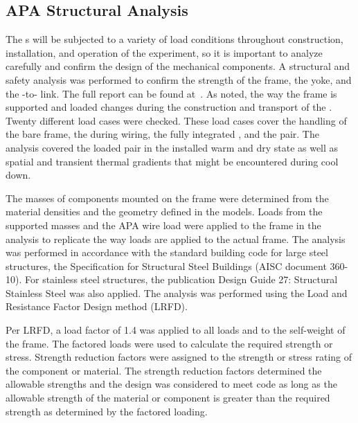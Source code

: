 \subsection{APA Structural Analysis}

The s will be subjected to a variety of load conditions throughout construction, installation, and operation of the experiment, so it is important to analyze carefully and confirm the design of the mechanical components.  A structural and safety analysis was performed to confirm the strength of the  frame, the  yoke, and the -to- link.  The full report can be found at~\cite{bib:cernedms2100877}. %
As noted, the way the  frame is supported and loaded changes during the construction and transport of the . Twenty different load cases were checked.  These load cases cover the handling of the bare frame, the  during wiring, the fully integrated , and the  pair.  The analysis covered the loaded  pair in the installed warm and dry state as well as spatial and transient thermal gradients that might be encountered during cool down.

The masses of components mounted on the frame were determined from the material densities and the geometry defined in the \threed models.  Loads from the supported masses and the APA wire load were applied to the frame in the analysis to replicate the way loads are applied to the actual frame.  The analysis was performed in accordance with the standard building code for large steel structures, the  Specification for Structural Steel Buildings (AISC document 360-10). For stainless steel structures, the   publication Design Guide 27: Structural Stainless Steel was also applied.  The analysis was performed using the Load and Resistance Factor Design method (LRFD).

Per LRFD, a load factor of 1.4 was applied to all loads and to the self-weight of the   frame.  The factored loads were used to calculate the required strength or stress.  Strength reduction factors were assigned to the strength or stress rating of the component or material.  The strength reduction factors determined the allowable strengths and the design was considered to meet code as long as the allowable strength of the material or component is greater than the required strength as determined by the factored loading.

